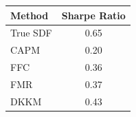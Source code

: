 \begin{tabular}{l c}
\toprule
Method & Sharpe Ratio \\
\midrule
True SDF & 0.65 \\
\midrule
CAPM & 0.20 \\
FFC & 0.36 \\
FMR & 0.37 \\
DKKM & 0.43 \\
\bottomrule
\end{tabular}